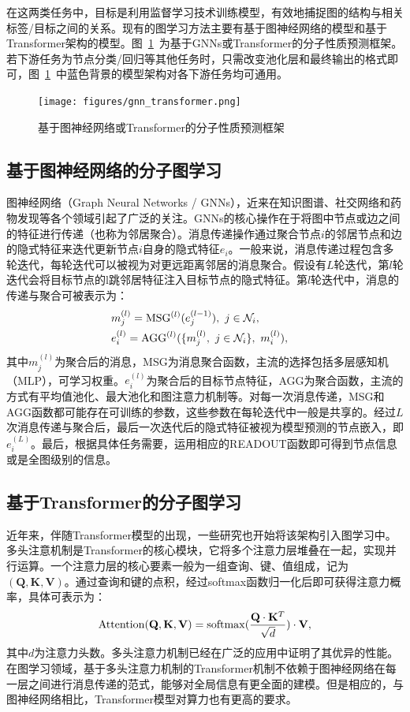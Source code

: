 在这两类任务中，目标是利用监督学习技术训练模型，有效地捕捉图的结构与相关标签/目标之间的关系。现有的图学习方法主要有基于图神经网络的模型和基于Transformer架构的模型。图~\ref{fig:gnntransformer}~为基于GNNs或Transformer的分子性质预测框架。若下游任务为节点分类/回归等其他任务时，只需改变池化层和最终输出的格式即可，图~\ref{fig:gnntransformer}~中蓝色背景的模型架构对各下游任务均可通用。

\begin{figure}[h]
    \centering
    \texttt{[image: figures/gnn\_transformer.png]}
    \caption{基于图神经网络或Transformer的分子性质预测框架}
    \label{fig:gnntransformer}
\end{figure} 

\subsection{基于图神经网络的分子图学习}
图神经网络（Graph Neural Networks / GNNs），近来在知识图谱、社交网络和药物发现等各个领域引起了广泛的关注。GNNs的核心操作在于将图中节点或边之间的特征进行传递（也称为邻居聚合）。消息传递操作通过聚合节点$i$的邻居节点和边的隐式特征来迭代更新节点$i$自身的隐式特征$e_i$。一般来说，消息传递过程包含多轮迭代，每轮迭代可以被视为对更远距离邻居的消息聚合。假设有$L$轮迭代，第$l$轮迭代会将目标节点的l跳邻居特征注入目标节点的隐式特征。第$l$轮迭代中，消息的传递与聚合可被表示为：
\begin{eqnarray}
    &m_j^{(l)} = {\rm MSG}^{(l)}(e_j^{(l-1)}), \ j \in \mathcal{N}_i, & \\
    &e_i^{(l)} = {\rm AGG}^{(l)}(\{ m_j^{(l)}, \ j \in \mathcal{N}_i \}, \ m_i^{(l)} ), &
\end{eqnarray}
其中$m_j^{(l)}$为聚合后的消息，MSG为消息聚合函数，主流的选择包括多层感知机（MLP），可学习权重。$e_i^{(l)}$为聚合后的目标节点特征，AGG为聚合函数，主流的方式有平均值池化、最大池化和图注意力机制等。对每一次消息传递，MSG和AGG函数都可能存在可训练的参数，这些参数在每轮迭代中一般是共享的。经过$L$次消息传递与聚合后，最后一次迭代后的隐式特征被视为模型预测的节点嵌入，即$e_i^{(L)}$。最后，根据具体任务需要，运用相应的READOUT函数即可得到节点信息或是全图级别的信息。

\subsection{基于Transformer的分子图学习}
近年来，伴随Transformer模型的出现，一些研究也开始将该架构引入图学习中。多头注意机制是Transformer的核心模块，它将多个注意力层堆叠在一起，实现并行运算。一个注意力层的核心要素一般为一组查询、键、值组成，记为$(\mathbf{Q}, \mathbf{K}, \mathbf{V})$。通过查询和键的点积，经过softmax函数归一化后即可获得注意力概率，具体可表示为：
\begin{eqnarray}
    {\rm Attention}(\mathbf{Q}, \mathbf{K}, \mathbf{V}) = {\rm softmax}(\frac{\mathbf{Q} \cdot \mathbf{K}^T}{\sqrt{d}}) \cdot \mathbf{V},
\end{eqnarray}
其中$d$为注意力头数。多头注意力机制已经在广泛的应用中证明了其优异的性能。在图学习领域，基于多头注意力机制的Transformer机制不依赖于图神经网络在每一层之间进行消息传递的范式，能够对全局信息有更全面的建模。但是相应的，与图神经网络相比，Transformer模型对算力也有更高的要求。

